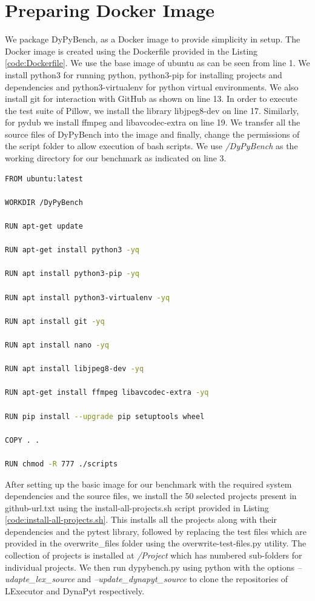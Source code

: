 \section{Preparing Docker Image}
We package DyPyBench, as a Docker image to provide simplicity in setup.
The Docker image is created using the Dockerfile provided in the Listing \ref{code:Dockerfile}.
We use the base image of ubuntu as can be seen from line 1.
We install python3 for running python, python3-pip for installing projects and dependencies and python3-virtualenv for python virtual environments.
We also install git for interaction with GitHub as shown on line 13.
In order to execute the test suite of Pillow, we install the library libjpeg8-dev on line 17.
Similarly, for pydub we install ffmpeg and libavcodec-extra on line 19.
We transfer all the source files of DyPyBench into the image and finally, change the permissions of the script folder to allow execution of bash scripts.
We use \textit{/DyPyBench} as the working directory for our benchmark as indicated on line 3.
\begin{lstlisting}[caption=Dockerfile,label=code:Dockerfile,language=Bash]
FROM ubuntu:latest

WORKDIR /DyPyBench

RUN apt-get update

RUN apt-get install python3 -yq

RUN apt install python3-pip -yq

RUN apt install python3-virtualenv -yq

RUN apt install git -yq

RUN apt install nano -yq

RUN apt install libjpeg8-dev -yq

RUN apt-get install ffmpeg libavcodec-extra -yq

RUN pip install --upgrade pip setuptools wheel

COPY . .

RUN chmod -R 777 ./scripts 
\end{lstlisting}

After setting up the basic image for our benchmark with the required system dependencies and the source files, we install the 50 selected projects present in github-url.txt using the install-all-projects.sh script provided in Listing \ref{code:install-all-projects.sh}.
This installs all the projects along with their dependencies and the pytest library, followed by replacing the test files which are provided in the overwrite\_files folder using the overwrite-test-files.py utility.
The collection of projects is installed at \textit{/Project} which has numbered sub-folders for individual projects.  
We then run dypybench.py using python with the options \textit{--udapte\_lex\_source} and \textit{--update\_dynapyt\_source} to clone the repositories of LExecutor and DynaPyt respectively.

